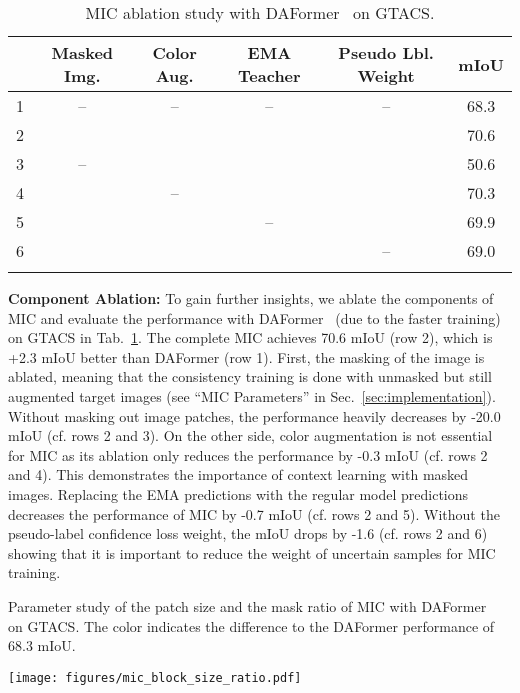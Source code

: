 \documentclass[10pt,twocolumn,letterpaper]{article}
\newcommand*{\cm}{\checkmark}
\begin{document}
\begin{table}[tb]
\centering
\caption{MIC ablation study with DAFormer~\cite{hoyer2021daformer} on GTACS.}
\label{tab:mic_ablation}
\setlength{\tabcolsep}{3pt}
\scriptsize
\begin{tabular}{lccccc}
\hline
  & Masked Img. & Color Aug. & EMA Teacher & Pseudo Lbl. Weight & mIoU \\
\hline\hline
\arrayrulecolor{gray}
1 &          -- &         -- &          -- &                 -- & 68.3 \\
2 &         \cm &        \cm &         \cm &                \cm & 70.6 \\
\hline
3 &          -- &        \cm &         \cm &                \cm & 50.6 \\
4 &         \cm &         -- &         \cm &                \cm & 70.3 \\
5 &         \cm &        \cm &          -- &                \cm & 69.9 \\
6 &         \cm &        \cm &         \cm &                 -- & 69.0 \\
\arrayrulecolor{black}
\hline
\end{tabular}
\end{table}
 
\noindent\textbf{Component Ablation:}
To gain further insights, we ablate the components of MIC and evaluate the performance with DAFormer~\cite{hoyer2021daformer} (due to the faster training) on GTACS in Tab.~\ref{tab:mic_ablation}. The complete MIC achieves 70.6 mIoU (row 2), which is +2.3 mIoU better than DAFormer (row 1).
First, the masking of the image is ablated, meaning that the consistency training is done with unmasked but still augmented target images (see ``MIC Parameters'' in Sec.~\ref{sec:implementation}). Without masking out image patches, the performance heavily decreases by -20.0 mIoU (cf. rows 2 and 3).
On the other side, color augmentation is not essential for MIC as its ablation only reduces the performance by -0.3 mIoU (cf. rows 2 and 4). This demonstrates the importance of context learning with masked images.
Replacing the EMA predictions with the regular model predictions decreases the performance of MIC by -0.7 mIoU (cf. rows 2 and 5). Without the pseudo-label confidence loss weight, the mIoU drops by -1.6 (cf. rows 2 and 6) showing that it is important to reduce the weight of uncertain samples for MIC training.

\begin{table}[tb]
\centering
\caption{Parameter study of the patch size  and the mask ratio  of MIC with DAFormer~\cite{hoyer2021daformer} on GTACS. The color indicates the difference to the DAFormer performance of 68.3 mIoU.}
\label{fig:block_size_ratio_study}
\texttt{[image: figures/mic\_block\_size\_ratio.pdf]}
\end{table}
\end{document}
